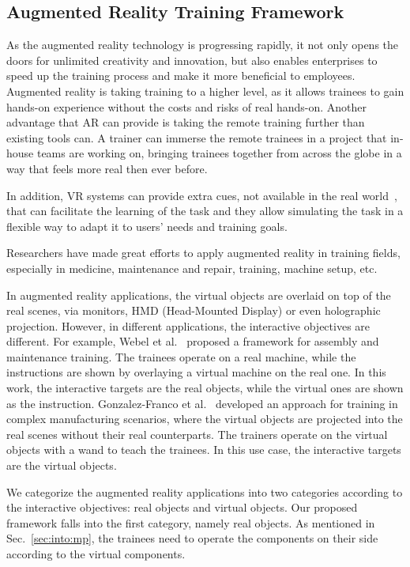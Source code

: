 \subsection{Augmented Reality Training Framework}

As the augmented reality technology is progressing rapidly, it not only opens the doors for unlimited creativity and innovation, but also enables enterprises to speed up the training process and make it more beneficial to employees.
Augmented reality is taking training to a higher level, as it allows trainees to gain hands-on experience without the costs and risks of real hands-on. Another advantage that AR can provide is taking the remote training further than existing tools can. A trainer can immerse the remote trainees in a project that in-house teams are working on, bringing trainees together from across the globe in a way that feels more real then ever before.

In addition, VR systems can provide extra cues, not available in the real world~\cite{gosselin2010}, that can facilitate the learning of the task and they allow simulating the task in a flexible way to adapt it to users' needs and training goals.

Researchers have made great efforts to apply augmented reality in training fields, especially in medicine, maintenance and repair, training, machine setup, etc.

In augmented reality applications, the virtual objects are overlaid on top of the real scenes, via monitors, HMD (Head-Mounted Display) or even holographic projection. However, in different applications, the interactive objectives are different. For example, Webel et al.~\cite{webel2011} proposed a framework for assembly and maintenance training. The trainees operate on a real machine, while the instructions are shown by overlaying a virtual machine on the real one. In this work, the interactive targets are the real objects, while the virtual ones are shown as the instruction. Gonzalez-Franco et al.~\cite{gonzalez-franco2016} developed an approach for training in complex manufacturing scenarios, where the virtual objects are projected into the real scenes without their real counterparts. The trainers operate on the virtual objects with a wand to teach the trainees. In this use case, the interactive targets are the virtual objects.

We categorize the augmented reality applications into two categories according to the interactive objectives: real objects and virtual objects. Our proposed framework falls into the first category, namely real objects. As mentioned in Sec.~\ref{sec:into:mp}, the trainees need to operate the components on their side according to the virtual components.

